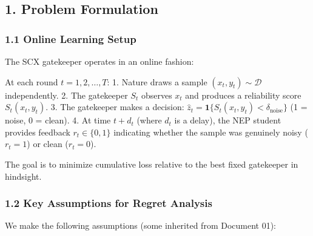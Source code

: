 \documentclass[
  12pt,
]{article}
\begin{document}
\subsection{1. Problem Formulation}\label{problem-formulation}

\subsubsection{1.1 Online Learning Setup}\label{online-learning-setup}

The SCX gatekeeper operates in an online fashion:

At each round \(t = 1, 2, \dots, T\): 1. Nature draws a sample
\((x_t, y_t) \sim \mathcal{D}\) independently. 2. The gatekeeper \(S_t\)
observes \(x_t\) and produces a reliability score \(S_t(x_t, y_t)\). 3.
The gatekeeper makes a decision:
\(\hat{z}_t = \mathbf{1}\{S_t(x_t, y_t) < \delta_{\text{noise}}\}\) (1 =
noise, 0 = clean). 4. At time \(t + d_t\) (where \(d_t\) is a delay),
the NEP student provides feedback \(r_t \in \{0, 1\}\) indicating
whether the sample was genuinely noisy (\(r_t = 1\)) or clean
(\(r_t = 0\)).

The goal is to minimize cumulative loss relative to the best fixed
gatekeeper in hindsight.

\subsubsection{1.2 Key Assumptions for Regret
Analysis}\label{key-assumptions-for-regret-analysis}

We make the following assumptions (some inherited from Document 01):
\end{document}
